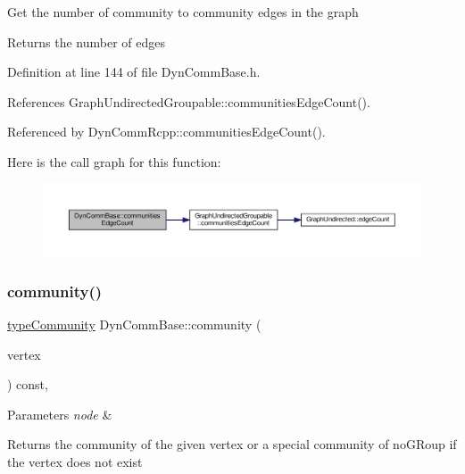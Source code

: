 Get the number of community to community edges in the graph

\begin{DoxyReturn}{Returns}
the number of edges 
\end{DoxyReturn}


Definition at line 144 of file Dyn\+Comm\+Base.\+h.



References Graph\+Undirected\+Groupable\+::communities\+Edge\+Count().



Referenced by Dyn\+Comm\+Rcpp\+::communities\+Edge\+Count().

Here is the call graph for this function\+:
\nopagebreak
\begin{figure}[H]
\begin{center}
\leavevmode
\includegraphics[width=350pt]{classDynCommBase_af95d4ab7f1814514fd5961900731ba12_cgraph}
\end{center}
\end{figure}
\mbox{\label{classDynCommBase_a651753518a2de4ea52caea518e74d878}} 
\subsubsection{\texorpdfstring{community()}{community()}}
{\footnotesize\ttfamily \hyperlink{graphUndirectedGroupable_8h_a914da95c9ea7f14f4b7f875c36818556}{type\+Community} Dyn\+Comm\+Base\+::community (\begin{DoxyParamCaption}\item[{\hyperlink{edge_8h_a5fbd20c46956d479cb10afc9855223f6}{type\+Vertex}}]{vertex }\end{DoxyParamCaption}) const\hspace{0.3cm}{\ttfamily [inline]}, {\ttfamily [virtual]}}


\begin{DoxyParams}{Parameters}
{\em node} & \\
\hline
\end{DoxyParams}
\begin{DoxyReturn}{Returns}
the community of the given vertex or a special community of no\+G\+Roup if the vertex does not exist 
\end{DoxyReturn}


